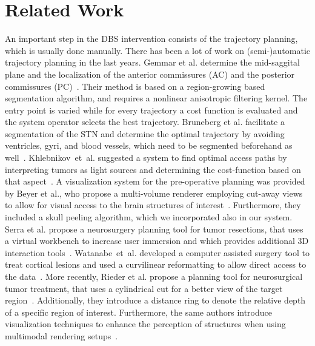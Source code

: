 \documentclass{vgtc}                          %
\begin{document}
\section{Related Work}\label{sec:related}
An important step in the DBS intervention consists of the trajectory planning, which is usually done manually. There has been a lot of work on (semi-)automatic trajectory planning in the last years. Gemmar et al. determine the mid-saggital plane and the localization of the anterior commissures (AC) and the posterior commissures (PC)~\cite{Gemmar2008}. Their method is based on a region-growing based segmentation algorithm, and requires a nonlinear anisotropic filtering kernel. The entry point is varied while for every trajectory a cost function is evaluated and the system operator selects the best trajectory. Bruneberg et al. facilitate a segmentation of the STN and determine the optimal trajectory by avoiding ventricles, gyri, and blood vessels, which need to be segmented beforehand as well~\cite{Brunenberg2007}. Khlebnikov~et~al. suggested a system to find optimal access paths by interpreting tumors as light sources and determining the cost-function based on that aspect~\cite{Khlebnikov2011}. A visualization system for the pre-operative planning was provided by Beyer et al., who propose a multi-volume renderer employing cut-away views to allow for visual access to the brain structures of interest~\cite{Beyer2007}. Furthermore, they included a skull peeling algorithm, which we incorporated also in our system. Serra et al. propose a neurosurgery planning tool for tumor resections, that uses a virtual workbench to increase user immersion and which provides additional 3D interaction tools~\cite{Serra1998}. Watanabe~et~al. developed a computer assisted surgery tool to treat cortical lesions and used a curvilinear reformatting to allow direct access to the data~\cite{Watanabe}.  More recently, Rieder et al. propose a planning tool for neurosurgical tumor treatment, that uses a cylindrical cut for a better view of the target region~\cite{Rieder2008}. Additionally, they introduce a distance ring to denote the relative depth of a specific region of interest. Furthermore, the same authors introduce visualization techniques to enhance the perception of structures when using multimodal rendering setups~\cite{Rieder2008a}.
\end{document}
